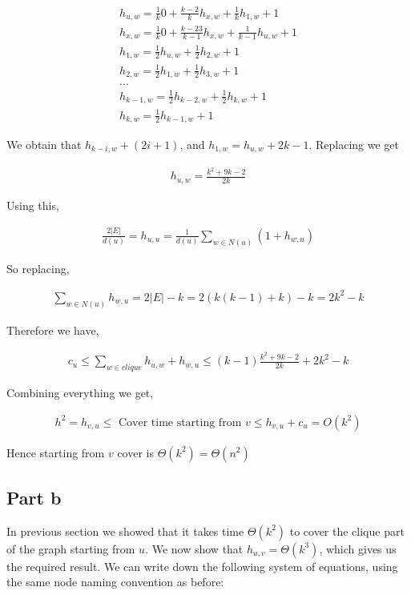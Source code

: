 \documentclass[12pt, a4paper]{article}
\begin{document}
\begin{align*}
  h_{u,w} = \frac{1}{k}0 + \frac{k-2}{k}h_{x,w} + \frac{1}{k}h_{1,w} + 1\\
  h_{x,w} = \frac{1}{k}0 + \frac{k-23}{k-1}h_{x,w} + \frac{1}{k-1}h_{u,w} + 1\\
  h_{1,w} = \frac{1}{2}h_{u,w} + \frac{1}{2}h_{2,w} + 1\\
  h_{2,w} = \frac{1}{2}h_{1,w} + \frac{1}{2}h_{3,w} + 1\\
  ...\\
  h_{k-1,w} = \frac{1}{2}h_{k-2,w} + \frac{1}{2}h_{k,w} + 1\\
  h_{k,w} = \frac{1}{2}h_{k-1,w} + 1
\end{align*}

We obtain that $h_{k-i,w} + (2i + 1)$, and $h_{1,w} = h_{u,w} + 2k - 1$.
Replacing we get

\begin{align*}
  h_{u,w} = \frac{k^2 + 9k - 2}{2k}
\end{align*}

Using this,

\begin{align*}
  \frac{2|E|}{d(u)} = h_{u,u} = \frac{1}{d(u)} \sum_{w \in N(u)} (1 + h_{w,u})
\end{align*}

So replacing,

\begin{align*}
  \sum_{w \in N(u)} h_{w,u} = 2|E| - k = 2(k(k - 1) + k) - k = 2k^2 - k
\end{align*}

Therefore we have,

\begin{align*}
  c_u \leq \sum_{w \in clique} h_{u,w} + h_{w,u} \leq (k -1) \frac{k^2 + 9k - 2}{2k} + 2k^2 - k 
\end{align*}

Combining everything we get,

\begin{align*}
  h^2 = h_{v,u} \leq \text{ Cover time starting from } v \leq h_{v,u} + c_u = O(k^2) 
\end{align*}

Hence starting from $v$ cover is $\Theta(k^2) = \Theta(n^2)$

\subsection{Part b}
In previous section we showed that it takes time $\Theta(k^2)$ to cover the
clique part of the graph starting from $u$. We now show that $h_{u,v} =
\Theta(k^3)$, which gives us the required result. We can write down the
following system of equations, using the same node naming convention as before:
\end{document}

